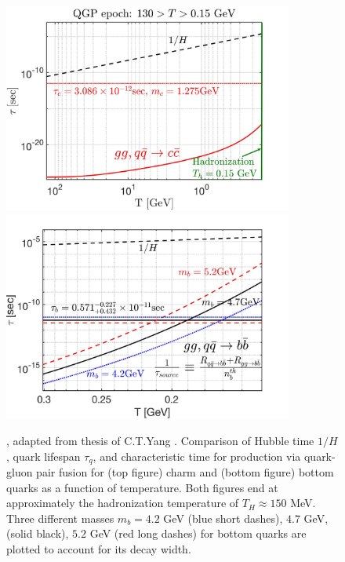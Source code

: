 \begin{figure} %
    \centering
    \includegraphics[width=0.85\textwidth]{./plots/CharmQuark_QGP.jpg}
    \includegraphics[width=0.85\textwidth]{./plots/BQuarkReactionTime_bottom.jpg}
    \caption{, adapted from thesis of C.T.Yang \cite{Yang:2024ret}. Comparison of Hubble time $1/H$, quark lifespan $\tau_{q}$, and characteristic time for production via quark-gluon pair fusion for (top figure) charm and (bottom figure) bottom quarks as a function of temperature. Both figures end at approximately the hadronization temperature of $T_{H}\approx150$ MeV. Three different masses $m_{b}=4.2$ GeV (blue short dashes), $4.7$ GeV, (solid black), $5.2$ GeV (red long dashes) for bottom quarks are plotted to account for its decay width.}
\label{BCreaction_fig}
\end{figure}



